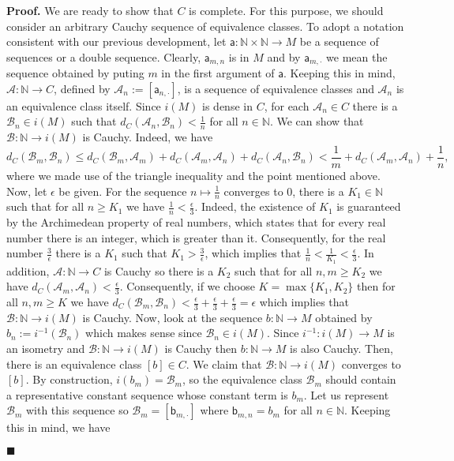\documentclass[10pt]{article}
\theoremstyle{definition}
\theoremstyle{remark}
\newenvironment{prf}{\noindent\textbf{Proof.}}{\hfill$\blacksquare$}
\begin{document}
\begin{prf}
We are ready to show that $C$ is complete. For this purpose, we should consider an arbitrary Cauchy sequence of equivalence classes. To adopt a notation consistent with our previous development, let $\mathsf{a}:\mathbb{N}\times\mathbb{N}\to M$ be a sequence of sequences or a double sequence. Clearly, $\mathsf{a}_{m,n}$ is in $M$ and by $\mathsf{a}_{m,\cdot}$ we mean the sequence obtained by puting $m$ in the first argument of $\mathsf{a}$. Keeping this in mind, $\mathcal{A}:\mathbb{N}\to C$, defined by $\mathcal{A}_n:=[\mathsf{a}_{n,\cdot}]$, is a sequence of equivalence classes and $\mathcal{A}_n$ is an equivalence class itself. Since $i(M)$ is dense in $C$, for each $\mathcal{A}_n\in C$ there is a $\mathcal{B}_n\in i(M)$ such that $d_C(\mathcal{A}_n,\mathcal{B}_n)<\frac{1}{n}$ for all $n\in \mathbb{N}$. We can show that $\mathcal{B}:\mathbb{N}\to i(M)$ is Cauchy. Indeed, we have
\begin{equation}
d_C(\mathcal{B}_m,\mathcal{B}_n)\leq d_C(\mathcal{B}_m,\mathcal{A}_m)+d_C(\mathcal{A}_m,\mathcal{A}_n)+d_C(\mathcal{A}_n,\mathcal{B}_n)<\frac{1}{m}+d_C(\mathcal{A}_m,\mathcal{A}_n)+\frac{1}{n},
\end{equation}
where we made use of the triangle inequality and the point mentioned above. Now, let $\epsilon$ be given. For the sequence $n \mapsto \frac{1}{n}$ converges to 0, there is a $K_1\in\mathbb{N}$ such that for all $n\ge K_1$ we have $\frac{1}{n} < \frac{\epsilon}{3}$. Indeed, the existence of $K_1$ is guaranteed by the Archimedean property of real numbers, which states that for every real number there is an integer, which is greater than it. Consequently, for the real number $\frac{3}{\epsilon}$ there is a $K_1$ such that $K_1>\frac{3}{\epsilon}$, which implies that $\frac{1}{n}<\frac{1}{K_1}<\frac{\epsilon}{3}$.  In addition, $\mathcal{A}:\mathbb{N}\to C$ is Cauchy so there is a $K_2$ such that for all $n,m \ge K_2$ we have $d_C(\mathcal{A}_m,\mathcal{A}_n)<\frac{\epsilon}{3}$. Consequently, if we choose $K=\max\{K_1,K_2\}$ then for all $n,m\ge K$ we have $d_C(\mathcal{B}_m,\mathcal{B}_n) < \frac{\epsilon}{3} + \frac{\epsilon}{3} + \frac{\epsilon}{3} = \epsilon$ which implies that $\mathcal{B}:\mathbb{N}\to i(M)$ is Cauchy. Now, look at the sequence $b:\mathbb{N}\to M$ obtained by $b_n:=i^{-1}(\mathcal{B}_n)$ which makes sense since $\mathcal{B}_n\in i(M)$. Since $i^{-1}:i(M)\to M$ is an isometry and $\mathcal{B}:\mathbb{N}\to i(M)$ is Cauchy then $b:\mathbb{N}\to M$ is also Cauchy. Then, there is an equivalence class $[b]\in C$. We claim that $\mathcal{B}:\mathbb{N}\to i(M)$ converges to $[b]$. By construction, $i(b_m)=\mathcal{B}_m$, so the equivalence class $\mathcal{B}_m$ should contain a representative constant sequence whose constant term is $b_m$. Let us represent $\mathcal{B}_m$ with this sequence so $\mathcal{B}_m=[\mathsf{b}_{m,\cdot}]$ where $\mathsf{b}_{m,n}=b_m$ for all $n\in\mathbb{N}$. Keeping this in mind, we have

\end{prf}
\end{document}

